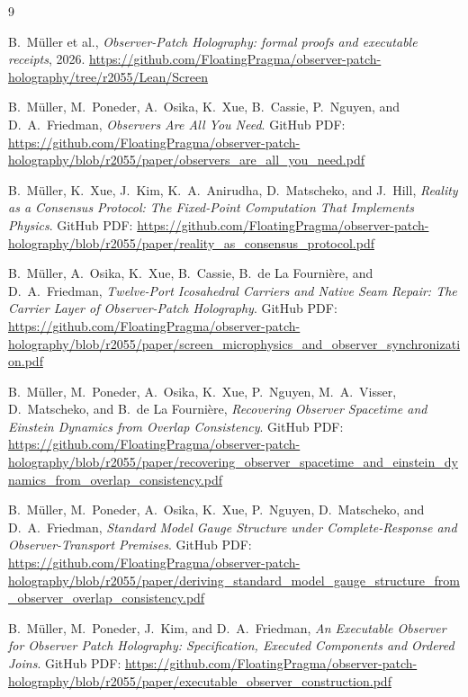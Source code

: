 \documentclass[11pt]{article}
\begin{document}

\begin{thebibliography}{9}

B.\ M\"uller et al.,
\emph{Observer-Patch Holography: formal proofs and executable receipts},
2026.
\url{https://github.com/FloatingPragma/observer-patch-holography/tree/r2055/Lean/Screen}

B.\ M\"uller, M.\ Poneder, A.\ Osika, K.\ Xue, B.\ Cassie, P.\ Nguyen, and D.\ A.\ Friedman,
\emph{Observers Are All You Need}.
GitHub PDF:
\url{https://github.com/FloatingPragma/observer-patch-holography/blob/r2055/paper/observers_are_all_you_need.pdf}

B.\ M\"uller, K.\ Xue, J.\ Kim, K.\ A.\ Anirudha, D.\ Matscheko, and J.\ Hill,
\emph{Reality as a Consensus Protocol: The Fixed-Point Computation That Implements Physics}.
GitHub PDF:
\url{https://github.com/FloatingPragma/observer-patch-holography/blob/r2055/paper/reality_as_consensus_protocol.pdf}

B.\ M\"uller, A.\ Osika, K.\ Xue, B.\ Cassie, B.\ de La Fourni\`ere, and D.\ A.\ Friedman,
\emph{Twelve-Port Icosahedral Carriers and Native Seam Repair: The Carrier Layer of Observer-Patch Holography}.
GitHub PDF:
\url{https://github.com/FloatingPragma/observer-patch-holography/blob/r2055/paper/screen_microphysics_and_observer_synchronization.pdf}

B.\ M\"uller, M.\ Poneder, A.\ Osika, K.\ Xue, P.\ Nguyen, M.\ A.\ Visser, D.\ Matscheko, and B.\ de La Fourni\`ere,
\emph{Recovering Observer Spacetime and Einstein Dynamics from Overlap Consistency}.
GitHub PDF:
\url{https://github.com/FloatingPragma/observer-patch-holography/blob/r2055/paper/recovering_observer_spacetime_and_einstein_dynamics_from_overlap_consistency.pdf}

B.\ M\"uller, M.\ Poneder, A.\ Osika, K.\ Xue, P.\ Nguyen, D.\ Matscheko, and D.\ A.\ Friedman,
\emph{Standard Model Gauge Structure under Complete-Response and Observer-Transport Premises}.
GitHub PDF:
\url{https://github.com/FloatingPragma/observer-patch-holography/blob/r2055/paper/deriving_standard_model_gauge_structure_from_observer_overlap_consistency.pdf}

B.\ M\"uller, M.\ Poneder, J.\ Kim, and D.\ A.\ Friedman,
\emph{An Executable Observer for Observer Patch Holography: Specification, Executed Components and Ordered Joins}.
GitHub PDF:
\url{https://github.com/FloatingPragma/observer-patch-holography/blob/r2055/paper/executable_observer_construction.pdf}


\end{thebibliography}
\end{document}

